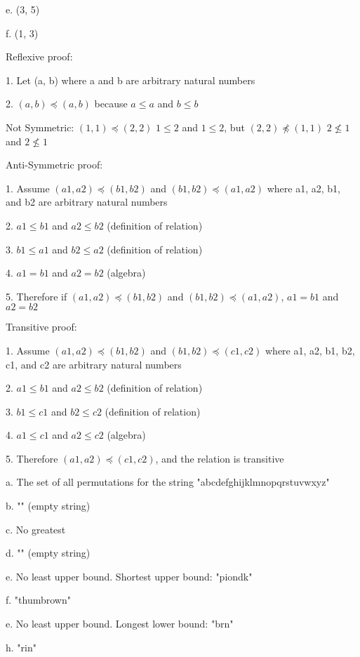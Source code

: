 \documentclass[12pt]{article}
\newenvironment{problem}[2][Problem]{\begin{trivlist}
\item[\hskip \labelsep {\bfseries #1}\hskip \labelsep {\bfseries #2.}]}{\end{trivlist}}
\begin{document}
e. (3, 5)

f. (1, 3)

Reflexive proof:

1. Let (a, b) where a and b are arbitrary natural numbers

2. $(a, b) \preccurlyeq (a, b)$ because $a \leq a$ and $b \leq b$

Not Symmetric: $(1, 1) \preccurlyeq (2, 2)$ $1 \leq 2$ and $1 \leq 2$, but $(2, 2) \npreceq (1, 1)$ $2 \nleq 1$ and $2 \nleq 1$

Anti-Symmetric proof:

1. Assume $(a1, a2) \preccurlyeq (b1, b2)$ and $(b1, b2) \preccurlyeq (a1, a2)$ where a1, a2, b1, and b2 are arbitrary natural numbers

2. $a1 \leq b1$ and $a2 \leq b2$ (definition of relation)

3. $b1 \leq a1$ and $b2 \leq a2$ (definition of relation)

4. $a1 = b1$ and $a2 = b2$ (algebra)

5. Therefore if $(a1, a2) \preccurlyeq (b1, b2)$ and $(b1, b2) \preccurlyeq (a1, a2)$, $a1 = b1$ and  $a2 = b2$

Transitive proof:

1. Assume $(a1, a2) \preccurlyeq (b1, b2)$ and $(b1, b2) \preccurlyeq (c1, c2)$ where a1, a2, b1, b2, c1, and c2 are arbitrary natural numbers

2. $a1 \leq b1$ and $a2 \leq b2$ (definition of relation)

3. $b1 \leq c1$ and $b2 \leq c2$ (definition of relation)

4. $a1 \leq c1$ and $a2 \leq c2$ (algebra)

5. Therefore $(a1, a2) \preccurlyeq (c1, c2)$, and the relation is transitive

\begin{problem}{Let S be the set of strings...}
\end{problem}

a. The set of all permutations for the string "abcdefghijklmnopqrstuvwxyz"

b. "" (empty string)

c. No greatest

d. "" (empty string)

e. No least upper bound. Shortest upper bound: "piondk"

f. "thumbrown"

e. No least upper bound. Longest lower bound: "brn"

h. "rin"
\end{document}

